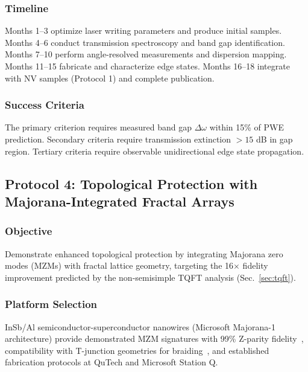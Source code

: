 \subsubsection{Timeline}

Months 1--3 optimize laser writing parameters and produce initial samples. Months 4--6 conduct transmission spectroscopy and band gap identification. Months 7--10 perform angle-resolved measurements and dispersion mapping. Months 11--15 fabricate and characterize edge states. Months 16--18 integrate with NV samples (Protocol 1) and complete publication.

\subsubsection{Success Criteria}

The primary criterion requires measured band gap $\Delta\omega$ within 15\% of PWE prediction. Secondary criteria require transmission extinction $> 15$ dB in gap region. Tertiary criteria require observable unidirectional edge state propagation.


\subsection{Protocol 4: Topological Protection with Majorana-Integrated Fractal Arrays}

\subsubsection{Objective}

Demonstrate enhanced topological protection by integrating Majorana zero modes (MZMs) with fractal lattice geometry, targeting the 16$\times$ fidelity improvement predicted by the non-semisimple TQFT analysis (Sec.~\ref{sec:tqft}).

\subsubsection{Platform Selection}

InSb/Al semiconductor-superconductor nanowires (Microsoft Majorana-1 architecture) provide demonstrated MZM signatures with 99\% Z-parity fidelity~\cite{Microsoft2025}, compatibility with T-junction geometries for braiding~\cite{Alicea2011}, and established fabrication protocols at QuTech and Microsoft Station Q.

